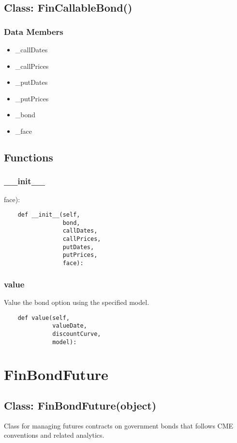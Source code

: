 \documentclass[twoside,11pt]{book}
\begin{document}
\subsection*{Class: FinCallableBond()}


\subsubsection*{Data Members}
\begin{itemize}
\item{\_callDates}
\item{\_callPrices}
\item{\_putDates}
\item{\_putPrices}
\item{\_bond}
\item{\_face}
\end{itemize}

\subsection*{Functions}

\subsubsection*{{\bf \_\_init\_\_}}
face): 

\begin{lstlisting}
    def __init__(self,
                 bond,
                 callDates,
                 callPrices,
                 putDates,
                 putPrices,
                 face):
\end{lstlisting}

\subsubsection*{{\bf value}}
Value the bond option using the specified model.  

\begin{lstlisting}
    def value(self,
              valueDate,
              discountCurve,
              model):
\end{lstlisting}

\newpage
\section{FinBondFuture}

\subsection*{Class: FinBondFuture(object)}
Class for managing futures contracts on government bonds that follows CME conventions and related analytics.  
\end{document}
